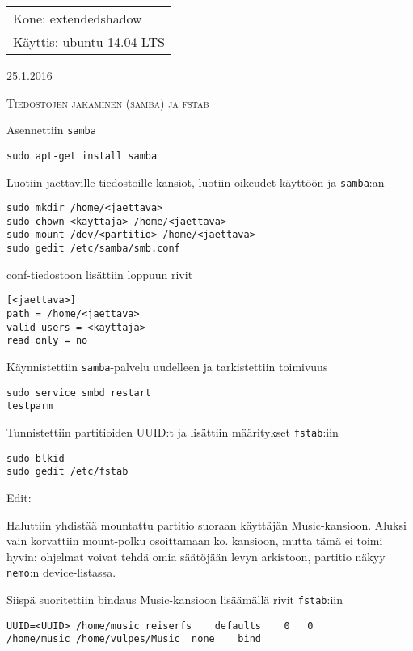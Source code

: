 \documentclass[main.tex]{subfiles}
\begin{document}
\thispagestyle{empty}
\begin{tabular}[t]{l}
Kone: extendedshadow\\
Käyttis: ubuntu 14.04 LTS
\end{tabular}
\hfill 25.1.2016

{\scshape\Large{Tiedostojen jakaminen (samba) ja fstab}}

Asennettiin \texttt{samba}

\begin{lstlisting}
sudo apt-get install samba
\end{lstlisting}

Luotiin jaettaville tiedostoille kansiot, luotiin oikeudet käyttöön ja \texttt{samba}:an

\begin{lstlisting}
sudo mkdir /home/<jaettava>
sudo chown <kayttaja> /home/<jaettava>
sudo mount /dev/<partitio> /home/<jaettava>
sudo gedit /etc/samba/smb.conf
\end{lstlisting}

conf-tiedostoon lisättiin loppuun rivit

\begin{lstlisting}
[<jaettava>]
path = /home/<jaettava>
valid users = <kayttaja>
read only = no
\end{lstlisting}

Käynnistettiin \texttt{samba}-palvelu uudelleen ja tarkistettiin toimivuus

\begin{lstlisting}
sudo service smbd restart
testparm
\end{lstlisting}

Tunnistettiin partitioiden UUID:t ja lisättiin määritykset \texttt{fstab}:iin

\begin{lstlisting}
sudo blkid
sudo gedit /etc/fstab
\end{lstlisting}

Edit:

Haluttiin yhdistää mountattu partitio suoraan käyttäjän Music-kansioon. Aluksi vain korvattiin mount-polku osoittamaan ko. kansioon, mutta tämä ei toimi hyvin: ohjelmat voivat tehdä omia säätöjään levyn arkistoon, partitio näkyy \texttt{nemo}:n device-listassa.

Siispä suoritettiin bindaus Music-kansioon lisäämällä rivit \texttt{fstab}:iin

\begin{lstlisting}
UUID=<UUID>	/home/music	reiserfs	defaults	0	0
/home/music	/home/vulpes/Music	none	bind
\end{lstlisting}
\end{document}
